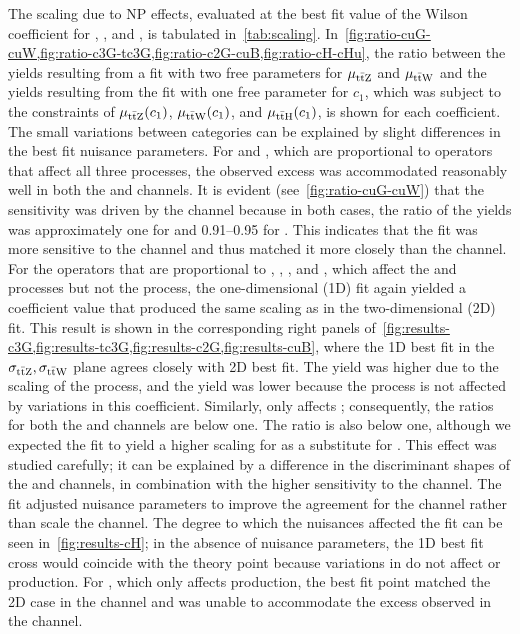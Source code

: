 The scaling due to NP effects, evaluated at the best fit value of the Wilson
coefficient for \ttZ, \ttW, and \ttH, is tabulated in~\cref{tab:scaling}.
In~\cref{fig:ratio-cuG-cuW,fig:ratio-c3G-tc3G,fig:ratio-c2G-cuB,fig:ratio-cH-cHu},
the ratio between the yields resulting from a fit with two free parameters for
$\mu_{\text{t}\bar{\text{t}}\text{Z}}$ and $\mu_{\text{t}\bar{\text{t}}\text{W}}$ and the yields resulting from the fit with one
free parameter for $c_1$, which was subject to the constraints of
$\mu_{\text{t}\bar{\text{t}}\text{Z}}(c_1)$, $\mu_{\text{t}\bar{\text{t}}\text{W}}(c_1)$, and $\mu_{\text{t}\bar{\text{t}}\text{H}}(c_1)$, is shown for each
coefficient. The small variations between categories can be explained by slight
differences in the best fit nuisance parameters. For \cuW and \cuG, which are
proportional to operators that affect all three processes, the observed excess
was accommodated reasonably well in both the \ttZ and \ttW channels. It is
evident (see~\cref{fig:ratio-cuG-cuW}) that the sensitivity was driven by the
\ttZ channel because in both cases, the ratio of the yields was approximately
one for \ttZ and \numrange{0.91}{0.95} for \ttW. This indicates that the fit was
more sensitive to the \ttZ channel and thus matched it more closely than the
\ttW channel. For the operators that are proportional to \tcthreeG, \cthreeG,
\cuB, and \ctwoG, which affect the \ttZ and \ttH processes but not the \ttW
process, the one-dimensional (1D) fit again yielded a coefficient value that
produced the same \ttZ scaling as in the two-dimensional (2D) fit. This result
is shown in the corresponding right panels
of~\cref{fig:results-c3G,fig:results-tc3G,fig:results-c2G,fig:results-cuB},
where the 1D best fit in the $\sigma_{\text{t}\bar{\text{t}}\text{Z}}, \sigma_{\text{t}\bar{\text{t}}\text{W}}$ plane agrees closely
with 2D best fit. The \ttH yield was higher due to the scaling of the \ttH
process, and the \ttW yield was lower because the \ttW process is not affected
by variations in this coefficient. Similarly, \cH only affects \ttH;
consequently, the ratios for both the \ttW and \ttZ channels are below one. The
\ttH ratio is also below one, although we expected the fit to yield a higher
scaling for \ttH as a substitute for \ttW. This effect was studied carefully; it
can be explained by a difference in the discriminant shapes of the \ttW and \ttH
channels, in combination with the higher sensitivity to the \ttZ channel. The
fit adjusted nuisance parameters to improve the agreement for the \ttZ channel
rather than scale the \ttH channel. The degree to which the nuisances affected
the fit can be seen in~\cref{fig:results-cH}; in the absence of nuisance
parameters, the 1D best fit cross would coincide with the theory point because
variations in \cH do not affect \ttW or \ttZ production. For \cHu, which only
affects \ttZ production, the best fit point matched the 2D case in the \ttZ
channel and was unable to accommodate the excess observed in the \ttW channel.

